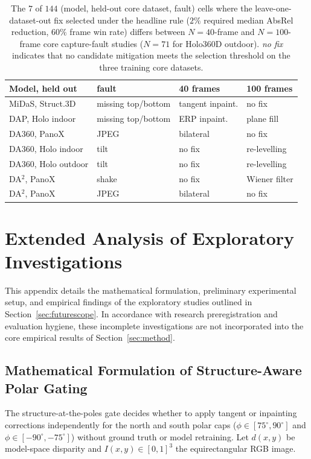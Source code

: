 \documentclass{article}
\newcommand{\absrel}{AbsRel}
\begin{document}
\begin{table}[!htbp]\centering\small
\caption{The $7$ of $144$ (model, held-out core dataset, fault) cells where the leave-one-dataset-out fix selected under the headline rule ($2\%$ required median \absrel{} reduction, $60\%$ frame win rate) differs between $N=40$-frame and $N=100$-frame core capture-fault studies ($N=71$ for Holo360D outdoor). \emph{no fix} indicates that no candidate mitigation meets the selection threshold on the three training core datasets.}\label{tab:stabilitydiff}
\begin{tabular}{llll}\toprule
Model, held out & fault & 40 frames & 100 frames\\\midrule
MiDaS, Struct.3D & missing top/bottom & tangent inpaint. & no fix\\
DAP, Holo indoor & missing top/bottom & ERP inpaint. & plane fill\\
DA360, PanoX & JPEG & bilateral & no fix\\
DA360, Holo indoor & tilt & no fix & re-levelling\\
DA360, Holo outdoor & tilt & no fix & re-levelling\\
DA$^2$, PanoX & shake & no fix & Wiener filter\\
DA$^2$, PanoX & JPEG & bilateral & no fix\\
\bottomrule\end{tabular}
\end{table}

\section{Extended Analysis of Exploratory Investigations}\label{app:incomplete_investigations}
This appendix details the mathematical formulation, preliminary experimental setup, and empirical findings of the exploratory studies outlined in Section~\ref{sec:futurescope}. In accordance with research preregistration and evaluation hygiene, these incomplete investigations are not incorporated into the core empirical results of Section~\ref{sec:method}.

\subsection{Mathematical Formulation of Structure-Aware Polar Gating}
The structure-at-the-poles gate decides whether to apply tangent or inpainting corrections independently for the north and south polar caps ($\phi \in [75^\circ, 90^\circ]$ and $\phi \in [-90^\circ, -75^\circ]$) without ground truth or model retraining. Let $d(x,y)$ be model-space disparity and $I(x,y) \in [0,1]^3$ the equirectangular RGB image.
\end{document}
